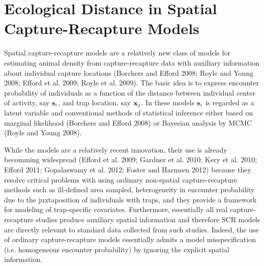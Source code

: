 \chapter{
Ecological Distance in Spatial Capture-Recapture Models
}
\label{chapt.implicit}


\vspace{.3in}


Spatial capture-recapture models are a relatively new class of models
for estimating animal density from capture-recapture data with
auxiliary information about individual capture locations (Borchers and
Efford 2008; Royle and Young 2008; Efford et al. 2009; Royle et
al. 2009).  The basic idea is to express encounter probability of
individuals as a function of the distance between individual center of
activity, say ${\bf s}_{i}$, and trap location, say ${\bf x}_{j}$.  In
these models ${\bf s}_{i}$ is regarded as a latent variable and
conventional methods of statistical inference either based on marginal
likelihood (Borchers and Efford 2008) or Bayesian analysis by MCMC
(Royle and Young 2008).

While the models are a relatively recent innovation, their use is
already becomming widespread (Efford et al. 2009; Gardner et al. 2010;
Kery et al. 2010; Efford 2011; Gopalaswamy et al. 2012; Foster and
Harmsen 2012) because they resolve critical problems with using
ordinary non-spatial capture-recapture methods such as ill-defined
area sampled, heterogeneity in encounter probability due to the
juxtaposition of individuals with traps, and they provide a framework
for modeling of trap-specific covariates.  Furthermore, essentially
all real capture-recapture studies produce auxiliary spatial
information and therefore SCR models are directly relevant to standard
data collected from such studies. Indeed, the use of ordinary
capture-recapture models essentially admits a model misspecification
(i.e. homogeneous encounter probability) by ignoring the explicit
spatial information.

